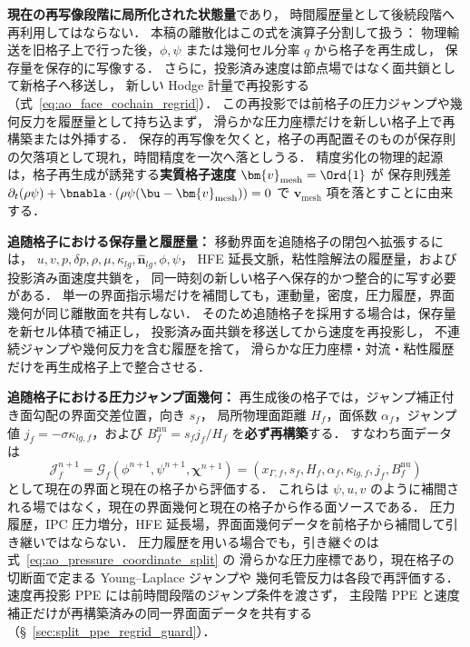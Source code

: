 \begin{tcolorbox}[mybox, title={固定格子経路と追随格子経路}]
\textbf{現在の再写像段階に局所化された状態量}であり，
時間履歴量として後続段階へ再利用してはならない．
本稿の離散化はこの式を演算子分割して扱う：
物理輸送を旧格子上で行った後，$\phi,\psi$ または幾何セル分率 $q$ から格子を再生成し，
保存量を保存的に写像する．
さらに，投影済み速度は節点場ではなく面共鎖として新格子へ移送し，
新しい Hodge 計量で再投影する（式~\eqref{eq:ao_face_cochain_regrid}）．
この再投影では前格子の圧力ジャンプや幾何反力を履歴量として持ち込まず，
滑らかな圧力座標だけを新しい格子上で再構築または外挿する．
保存的再写像を欠くと，格子の再配置そのものが保存則の欠落項として現れ，時間精度を一次へ落としうる．
精度劣化の物理的起源は，格子再生成が誘発する\textbf{実質格子速度} $\bm{v}_\text{mesh}=\Ord{1}$ が
保存則残差 $\partial_t(\rho\psi) + \bnabla\cdot(\rho\psi(\bu-\bm{v}_\text{mesh}))=0$ で
$\bm{v}_\text{mesh}$ 項を落とすことに由来する．

\textbf{追随格子における保存量と履歴量：}
移動界面を追随格子の閉包へ拡張するには，
$u,v,p,\delta p,\rho,\mu,\kappa_{lg},\hat{\bm n}_{lg},\phi,\psi$，
HFE 延長文脈，粘性陰解法の履歴量，および投影済み面速度共鎖を，
同一時刻の新しい格子へ保存的かつ整合的に写す必要がある．
単一の界面指示場だけを補間しても，運動量，密度，圧力履歴，界面幾何が同じ離散面を共有しない．
そのため追随格子を採用する場合は，保存量を新セル体積で補正し，
投影済み面共鎖を移送してから速度を再投影し，
不連続ジャンプや幾何反力を含む履歴を捨て，
滑らかな圧力座標・対流・粘性履歴だけを再生成格子上で整合させる．

\textbf{追随格子における圧力ジャンプ面幾何：}
再生成後の格子では，ジャンプ補正付き面勾配の界面交差位置，向き $s_f$，
局所物理面距離 $H_f$，面係数 $\alpha_f$，ジャンプ値
$j_f=-\sigma\kappa_{lg,f}$，および
$B_f^{\mathrm{nu}}=s_fj_f/H_f$ を\textbf{必ず再構築}する．
すなわち面データは
\[
  \mathcal{J}_f^{n+1}
  =
  \mathcal{G}_f\!\left(\phi^{n+1},\psi^{n+1},\bm{\chi}^{n+1}\right)
  =
  \left(x_{\Gamma,f},s_f,H_f,\alpha_f,
        \kappa_{lg,f},j_f,B_f^{\mathrm{nu}}\right)
  \label{eq:regrid_face_geometry}
\]
として現在の界面と現在の格子から評価する．
これらは $\psi,u,v$ のように補間される場ではなく，現在の界面幾何と現在の格子から作る面ソースである．
圧力履歴，IPC 圧力増分，HFE 延長場，界面面幾何データを前格子から補間して引き継いではならない．
圧力履歴を用いる場合でも，引き継ぐのは式~\eqref{eq:ao_pressure_coordinate_split} の
滑らかな圧力座標であり，現在格子の切断面で定まる Young--Laplace ジャンプや
幾何毛管反力は各段で再評価する．
速度再投影 PPE には前時間段階のジャンプ条件を渡さず，
主段階 PPE と速度補正だけが再構築済みの同一界面面データを共有する
（§~\ref{sec:split_ppe_regrid_guard}）．


\end{tcolorbox}
